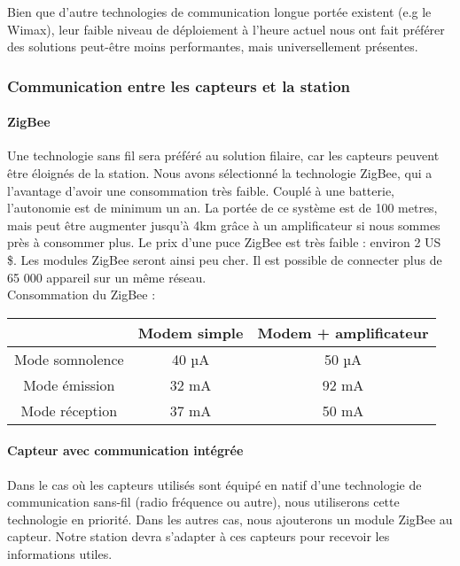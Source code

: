 Bien que d’autre technologies de communication longue portée existent (e.g le Wimax), leur faible niveau de déploiement à l’heure actuel nous ont fait préférer des solutions peut-être moins performantes, mais universellement présentes.

\subsubsection{Communication entre les capteurs et la station}

\paragraph{ZigBee}

Une technologie sans fil sera préféré au solution filaire, car les capteurs peuvent être éloignés de la station. Nous avons sélectionné la technologie ZigBee, qui a l’avantage d’avoir une consommation très faible. Couplé à une batterie, l’autonomie est de minimum un an. 
La portée de ce système est de 100 metres, mais peut être augmenter jusqu’à 4km grâce à un amplificateur si nous sommes près à consommer plus. Le prix d’une puce ZigBee est très faible : environ 2 US \$. Les modules ZigBee seront ainsi peu cher.
Il est possible de connecter plus de 65 000 appareil sur un même réseau.\\

Consommation du ZigBee :

\begin{center}
\begin{tabular}{|c|c|c|}
\hline  & Modem simple & Modem + amplificateur \\ 
\hline Mode somnolence & 40 µA & 50 µA \\ 
\hline Mode émission & 32 mA  & 92 mA \\ 
\hline Mode réception & 37 mA  & 50 mA \\ 
\hline 
\end{tabular} 
\end{center}

\paragraph{Capteur avec communication intégrée}

Dans le cas où les capteurs utilisés sont équipé en natif d’une technologie de communication sans-fil (radio fréquence ou autre), nous utiliserons cette technologie en priorité. Dans les autres cas, nous ajouterons un module ZigBee au capteur. Notre station devra s’adapter à ces capteurs pour recevoir les informations utiles.

